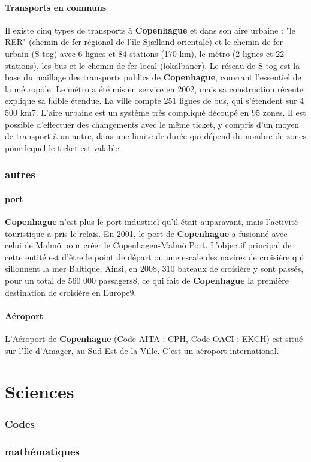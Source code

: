 \documentclass[a4paper,10pt,openany]{memoir}
\begin{document}
\subsection{Transports en communs}
Il existe cinq types de transports à \textbf{Copenhague} et dans son aire urbaine : "le RER" (chemin de fer régional de l'île Sjælland orientale) et le chemin de fer urbain (S-tog) avec 6 lignes et 84 stations (170 km), le métro (2 lignes et 22 stations), les bus et le chemin de fer local (lokalbaner). Le réseau de S-tog est la base du maillage des transports publics de \textbf{Copenhague}, couvrant l'essentiel de la métropole. Le métro a été mis en service en 2002, mais sa construction récente explique sa faible étendue. La ville compte 251 lignes de bus, qui s'étendent sur 4 500 km7. L'aire urbaine est un système très compliqué découpé en 95 zones. Il est possible d'effectuer des changements avec le même ticket, y compris d'un moyen de transport à un autre, dans une limite de durée qui dépend du nombre de zones pour lequel le ticket est valable.

\section{autres}
\subsection{port}
\textbf{Copenhague} n'est plus le port industriel qu'il était auparavant, mais l'activité touristique a pris le relais. En 2001, le port de \textbf{Copenhague} a fusionné avec celui de Malmö pour créer le Copenhagen-Malmö Port. L'objectif principal de cette entité est d'être le point de départ ou une escale des navires de croisière qui sillonnent la mer Baltique. Ainsi, en 2008, 310 bateaux de croisière y sont passés, pour un total de 560 000 passagers8, ce qui fait de \textbf{Copenhague} la première destination de croisière en Europe9.
\subsection{Aéroport}
L'Aéroport de \textbf{Copenhague} (Code AITA : CPH, Code OACI : EKCH) est situé sur l'Île d'Amager, au Sud-Est de la Ville. C'est un aéroport international.

\part{Sciences}

\section{Codes}

\section{mathématiques}
\end{document}
